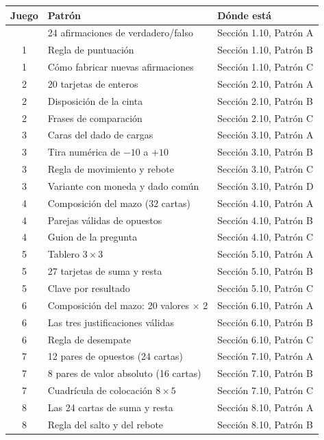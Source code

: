 \documentclass[12pt, letterpaper]{article}
\begin{document}
\begin{longtable}{@{}c l l@{}}
\toprule
\textbf{Juego} & \textbf{Patrón} & \textbf{Dónde está}\\
\midrule
\endhead
\bottomrule
\endfoot
1 & 24 afirmaciones de verdadero/falso & Sección 1.10, Patrón A\\
1 & Regla de puntuación & Sección 1.10, Patrón B\\
1 & Cómo fabricar nuevas afirmaciones & Sección 1.10, Patrón C\\
2 & 20 tarjetas de enteros & Sección 2.10, Patrón A\\
2 & Disposición de la cinta & Sección 2.10, Patrón B\\
2 & Frases de comparación & Sección 2.10, Patrón C\\
3 & Caras del dado de cargas & Sección 3.10, Patrón A\\
3 & Tira numérica de $-10$ a $+10$ & Sección 3.10, Patrón B\\
3 & Regla de movimiento y rebote & Sección 3.10, Patrón C\\
3 & Variante con moneda y dado común & Sección 3.10, Patrón D\\
4 & Composición del mazo (32 cartas) & Sección 4.10, Patrón A\\
4 & Parejas válidas de opuestos & Sección 4.10, Patrón B\\
4 & Guion de la pregunta & Sección 4.10, Patrón C\\
5 & Tablero $3\times 3$ & Sección 5.10, Patrón A\\
5 & 27 tarjetas de suma y resta & Sección 5.10, Patrón B\\
5 & Clave por resultado & Sección 5.10, Patrón C\\
6 & Composición del mazo: 20 valores $\times$ 2 & Sección 6.10, Patrón A\\
6 & Las tres justificaciones válidas & Sección 6.10, Patrón B\\
6 & Regla de desempate & Sección 6.10, Patrón C\\
7 & 12 pares de opuestos (24 cartas) & Sección 7.10, Patrón A\\
7 & 8 pares de valor absoluto (16 cartas) & Sección 7.10, Patrón B\\
7 & Cuadrícula de colocación $8\times 5$ & Sección 7.10, Patrón C\\
8 & Las 24 cartas de suma y resta & Sección 8.10, Patrón A\\
8 & Regla del salto y del rebote & Sección 8.10, Patrón B\\

\end{longtable}
\end{document}

